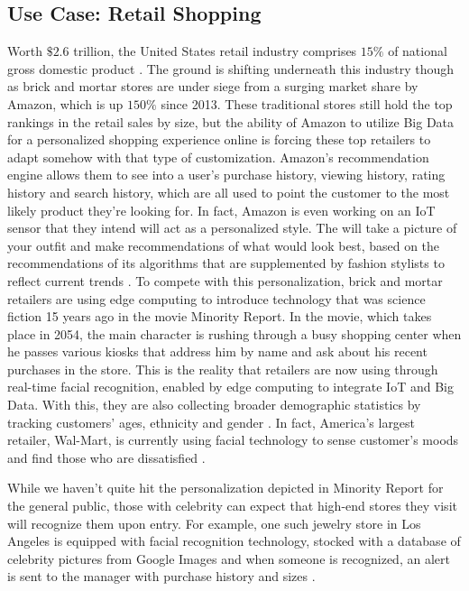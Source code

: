 \documentclass[sigconf]{acmart}
\begin{document}
\subsection{Use Case: Retail Shopping}
Worth $\$2.6$ trillion, the United States retail industry comprises $15\%$ of national gross domestic product \cite{retail}. The ground is shifting underneath this industry though as brick and mortar stores are under siege from a surging market share by Amazon, which is up $150\%$ since 2013. These traditional stores still hold the top rankings in the retail sales by size, but the ability of Amazon to utilize Big Data for a personalized shopping experience online is forcing these top retailers to adapt somehow with that type of customization. Amazon's recommendation engine allows them to see into a user's purchase history, viewing history, rating history and search history, which are all used to point the customer to the most likely product they're looking for. In fact, Amazon is even working on an IoT sensor that they intend will act as a personalized style. The  will take a picture of your outfit and make recommendations of what would look best, based on the recommendations of its algorithms that are supplemented by fashion stylists to reflect current trends \cite{amznstyle}.  
To compete with this personalization, brick and mortar retailers are using edge computing to introduce technology that was science fiction 15 years ago in the movie Minority Report. In the movie, which takes place in 2054, the main character is rushing through a busy shopping center when he passes various kiosks that address him by name and ask about his recent purchases in the store. This is the reality that retailers are now using through real-time facial recognition, enabled by edge computing to integrate IoT and Big Data. With this, they are also collecting broader demographic statistics by tracking customers' ages, ethnicity and gender \cite{facialtech}. In fact, America's largest retailer, Wal-Mart, is currently using facial technology to sense customer's moods and find those who are dissatisfied \cite{walmart}. 

While we haven't quite hit the personalization depicted in Minority Report for the general public, those with celebrity can expect that high-end stores they visit will recognize them upon entry. For example, one such jewelry store in Los Angeles is equipped with facial recognition technology, stocked with a database of celebrity pictures from Google Images and when someone is recognized, an alert is sent to the manager with purchase history and sizes \cite{npr}. 
\end{document}
